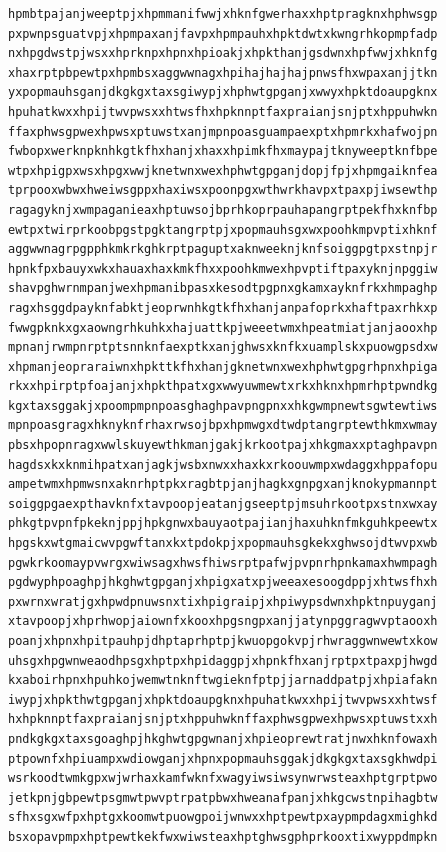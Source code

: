 \documentclass[11pt,letterpaper]{exam}
\begin{document}
\begin{questions}
\begin{verbatim}
hpmbtpajanjweeptpjxhpmmanifwwjxhknfgwerhaxxhptpragknxhphwsgp
pxpwnpsguatvpjxhpmpaxanjfavpxhpmpauhxhpktdwtxkwngrhkopmpfadp
nxhpgdwstpjwsxxhprknpxhpnxhpioakjxhpkthanjgsdwnxhpfwwjxhknfg
xhaxrptpbpewtpxhpmbsxaggwwnagxhpihajhajhajpnwsfhxwpaxanjjtkn
yxpopmauhsganjdkgkgxtaxsgiwypjxhphwtgpganjxwwyxhpktdoaupgknx
hpuhatkwxxhpijtwvpwsxxhtwsfhxhpknnptfaxpraianjsnjptxhppuhwkn
ffaxphwsgpwexhpwsxptuwstxanjmpnpoasguampaexptxhpmrkxhafwojpn
fwbopxwerknpknhkgtkfhxhanjxhaxxhpimkfhxmaypajtknyweeptknfbpe
wtpxhpigpxwsxhpgxwwjknetwnxwexhphwtgpganjdopjfpjxhpmgaiknfea
tprpooxwbwxhweiwsgppxhaxiwsxpoonpgxwthwrkhavpxtpaxpjiwsewthp
ragagyknjxwmpaganieaxhptuwsojbprhkoprpauhapangrptpekfhxknfbp
ewtpxtwirprkoobpgstpgktangrptpjxpopmauhsgxwxpoohkmpvptixhknf
aggwwnagrpgpphkmkrkghkrptpaguptxaknweeknjknfsoiggpgtpxstnpjr
hpnkfpxbauyxwkxhauaxhaxkmkfhxxpoohkmwexhpvptiftpaxyknjnpggiw
shavpghwrnmpanjwexhpmanibpasxkesodtpgpnxgkamxayknfrkxhmpaghp
ragxhsggdpayknfabktjeoprwnhkgtkfhxhanjanpafoprkxhaftpaxrhkxp
fwwgpknkxgxaowngrhkuhkxhajuattkpjweeetwmxhpeatmiatjanjaooxhp
mpnanjrwmpnrptptsnnknfaexptkxanjghwsxknfkxuamplskxpuowgpsdxw
xhpmanjeopraraiwnxhpkttkfhxhanjgknetwnxwexhphwtgpgrhpnxhpiga
rkxxhpirptpfoajanjxhpkthpatxgxwwyuwmewtxrkxhknxhpmrhptpwndkg
kgxtaxsggakjxpoompmpnpoasghaghpavpngpnxxhkgwmpnewtsgwtewtiws
mpnpoasgragxhknyknfrhaxrwsojbpxhpmwgxdtwdptangrptewthkmxwmay
pbsxhpopnragxwwlskuyewthkmanjgakjkrkootpajxhkgmaxxptaghpavpn
hagdsxkxknmihpatxanjagkjwsbxnwxxhaxkxrkoouwmpxwdaggxhppafopu
ampetwmxhpmwsnxaknrhptpkxragbtpjanjhagkxgnpgxanjknokypmannpt
soiggpgaexpthavknfxtavpoopjeatanjgseeptpjmsuhrkootpxstnxwxay
phkgtpvpnfpkeknjppjhpkgnwxbauyaotpajianjhaxuhknfmkguhkpeewtx
hpgskxwtgmaicwvpgwftanxkxtpdokpjxpopmauhsgkekxghwsojdtwvpxwb
pgwkrkoomaypvwrgxwiwsagxhwsfhiwsrptpafwjpvpnrhpnkamaxhwmpagh
pgdwyphpoaghpjhkghwtgpganjxhpigxatxpjweeaxesoogdppjxhtwsfhxh
pxwrnxwratjgxhpwdpnuwsnxtixhpigraipjxhpiwypsdwnxhpktnpuyganj
xtavpoopjxhprhwopjaiownfxkooxhpgsngpxanjjatynpggragwvptaooxh
poanjxhpnxhpitpauhpjdhptaprhptpjkwuopgokvpjrhwraggwnwewtxkow
uhsgxhpgwnweaodhpsgxhptpxhpidaggpjxhpnkfhxanjrptpxtpaxpjhwgd
kxaboirhpnxhpuhkojwemwtnknftwgieknfptpjjarnaddpatpjxhpiafakn
iwypjxhpkthwtgpganjxhpktdoaupgknxhpuhatkwxxhpijtwvpwsxxhtwsf
hxhpknnptfaxpraianjsnjptxhppuhwknffaxphwsgpwexhpwsxptuwstxxh
pndkgkgxtaxsgoaghpjhkghwtgpgwnanjxhpieoprewtratjnwxhknfowaxh
ptpownfxhpiuampxwdiowganjxhpnxpopmauhsggakjdkgkgxtaxsgkhwdpi
wsrkoodtwmkgpxwjwrhaxkamfwknfxwagyiwsiwsynwrwsteaxhptgrptpwo
jetkpnjgbpewtpsgmwtpwvptrpatpbwxhweanafpanjxhkgcwstnpihagbtw
sfhxsgxwfpxhptgxkoomwtpuowgpoijwnwxxhptpewtpxaypmpdagxmighkd
bsxopavpmpxhptpewtkekfwxwiwsteaxhptghwsgphprkooxtixwyppdmpkn

\end{verbatim}
\end{questions}
\end{document}
